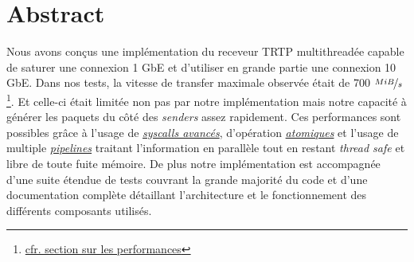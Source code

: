 \documentclass[8pt]{article}
\begin{document}

\newpage

\section{Abstract}

Nous avons conçus une implémentation du receveur TRTP multithreadée capable de saturer une connexion 1 GbE et d'utiliser en grande partie une connexion 10 GbE.
Dans nos tests, la vitesse de transfer maximale observée était de 700 $\nicefrac{MiB}{s}$\footnote{\hyperref[sec:performance]{cfr. section sur les performances}}. Et celle-ci
était limitée non pas par notre implémentation mais notre capacité à générer les paquets du côté des \textit{senders} assez rapidement. Ces performances sont possibles grâce à l'usage de
\textit{\hyperref[sec:syscalls]{syscalls avancés}}, d'opération \textit{\hyperref[sec:atomics]{atomiques}} et l'usage de multiple \textit{\hyperref[sec:pipelines]{pipelines}} traitant
l'information en parallèle tout en restant \textit{thread safe} et libre de toute fuite mémoire. De plus notre implémentation est accompagnée d'une suite
étendue de tests couvrant la grande majorité du code et d'une documentation complète détaillant l'architecture et le fonctionnement des différents composants
utilisés.

\newpage

\tableofcontents
\newpage


\newpage


\newpage


\newpage



\end{document}
